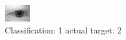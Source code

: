 \begin{figure}[h!]
\begin{center}
\includegraphics[width=0.60\columnwidth]{figures/ID347_class_1_target_2.png}
\end{center}
\caption{ Classification: 1 actual target: 2}
\label{fig:ID347_class_1_target_2}
\end{figure}
